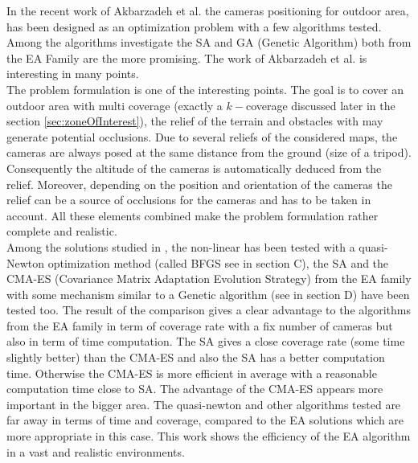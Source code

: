 In the recent work of Akbarzadeh et al. \cite{141*akbarzadeh2013} the cameras positioning for outdoor area, has been designed as an optimization problem with a few algorithms tested. Among the algorithms investigate the SA and GA (Genetic Algorithm) both from the EA Family are the more promising. 
The work of Akbarzadeh et al. \cite{141*akbarzadeh2013} is interesting in many points. \\
The problem formulation is one of the interesting points. The goal is to cover an outdoor area with  multi coverage (exactly a $k-$coverage  discussed later in the  section \ref{sec:zoneOfInterest}), the relief of the terrain and obstacles with may generate potential occlusions. 
Due to several reliefs of the considered maps, the cameras are always posed at the same distance from the ground (size of a tripod). Consequently the altitude of the cameras is automatically deduced from the relief. 
 Moreover, depending on the position and orientation of the cameras the relief can be a source of occlusions for the cameras and has to be taken in account.
All these elements combined make the problem formulation rather complete and realistic.\\
 Among the solutions studied in \cite{141*akbarzadeh2013}, the non-linear has been tested with a quasi-Newton optimization method (called BFGS see in \cite{141*akbarzadeh2013} section C), the SA and the CMA-ES (Covariance Matrix Adaptation Evolution Strategy) from the EA family with some mechanism similar to a Genetic algorithm (see in \cite{141*akbarzadeh2013} section D) have been tested too.
The result of the comparison gives a clear advantage to the algorithms from the EA family in term of coverage rate with a fix number of cameras but also in term of time computation. 
 The SA gives a close coverage rate (some time slightly better) than the CMA-ES and also the SA has a better  computation time. Otherwise the CMA-ES is more efficient in average with a reasonable computation time close to SA. The advantage of the CMA-ES appears more important in the bigger area. The quasi-newton and other algorithms tested are far away in terms of time and coverage, compared to the EA solutions which are more appropriate in this case. This work shows \cite{141*akbarzadeh2013} the efficiency of the EA algorithm in a vast and realistic environments.
 

